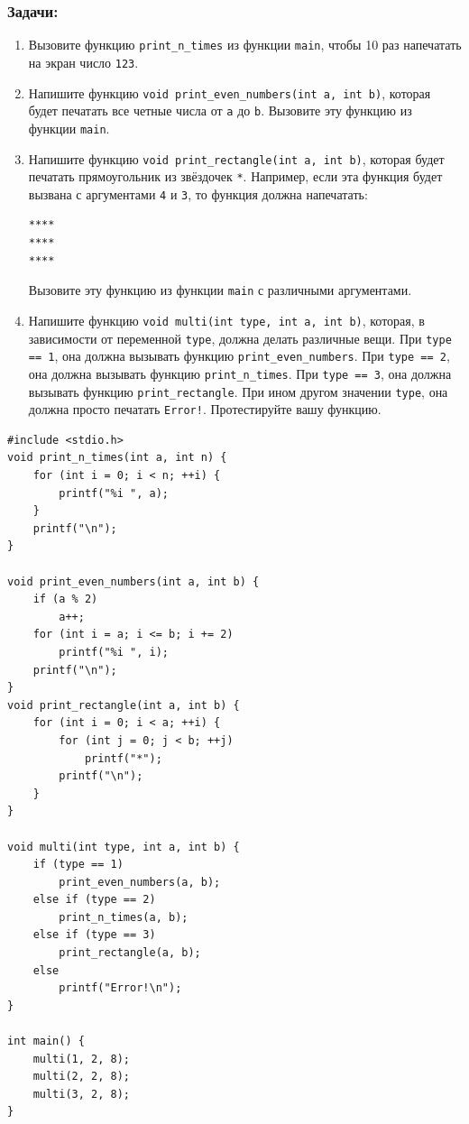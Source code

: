 \documentclass{article}
\begin{document}
\subsubsection*{Задачи:}
\begin{enumerate}
\item Вызовите функцию \texttt{print\_n\_times} из функции \texttt{main}, чтобы 10 раз напечатать на экран число \texttt{123}.
\item Напишите функцию \texttt{void print\_even\_numbers(int a, int b)}, которая будет печатать все четные числа от \texttt{a} до \texttt{b}. Вызовите эту функцию из функции \texttt{main}.

\item Напишите функцию \texttt{void print\_rectangle(int a, int b)}, которая будет печатать прямоугольник из звёздочек \texttt{*}.  Например, если эта функция будет вызвана с аргументами \texttt{4} и \texttt{3}, то функция должна напечатать:
\begin{verbatim}
****
****
****
\end{verbatim}
Вызовите эту функцию из функции \texttt{main} с различными аргументами.
\item Напишите функцию \texttt{void multi(int type, int a, int b)}, которая, в зависимости от переменной \texttt{type}, должна делать различные вещи. При \texttt{type == 1}, она должна вызывать функцию  \texttt{print\_even\_numbers}. При \texttt{type == 2}, она должна вызывать функцию  \texttt{print\_n\_times}. При \texttt{type == 3}, она должна вызывать функцию  \texttt{print\_rectangle}. При ином другом значении \texttt{type}, она должна просто печатать \texttt{Error!}. Протестируйте вашу функцию.
\end{enumerate}
\begin{lstlisting}[backgroundcolor = \color{solcolor}]
#include <stdio.h>
void print_n_times(int a, int n) {
    for (int i = 0; i < n; ++i) {
        printf("%i ", a);
    }
    printf("\n");
}

void print_even_numbers(int a, int b) {
    if (a % 2)
        a++;
    for (int i = a; i <= b; i += 2)
        printf("%i ", i);
    printf("\n");
}
void print_rectangle(int a, int b) {
    for (int i = 0; i < a; ++i) {
        for (int j = 0; j < b; ++j)
            printf("*");
        printf("\n");
    }
}

void multi(int type, int a, int b) {
    if (type == 1)
        print_even_numbers(a, b);
    else if (type == 2)
        print_n_times(a, b);
    else if (type == 3)
        print_rectangle(a, b);
    else
        printf("Error!\n");
}

int main() {
    multi(1, 2, 8);
    multi(2, 2, 8);
    multi(3, 2, 8);
}
\end{lstlisting}
\newpage
\end{document}

